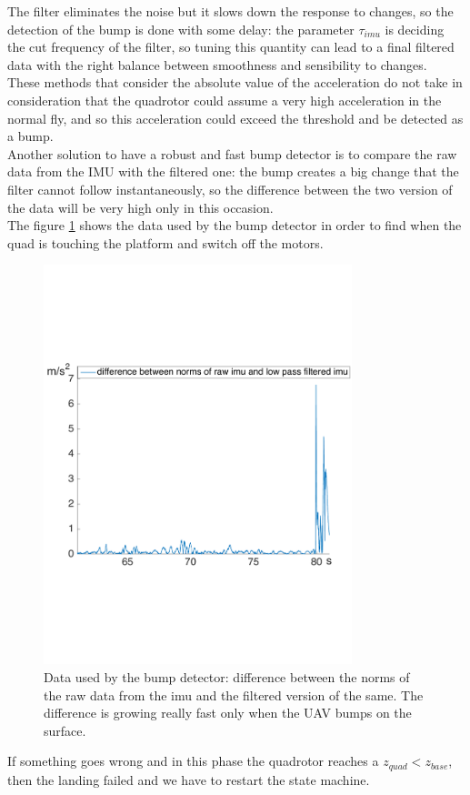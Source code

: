 The filter eliminates the noise but it slows down the response to changes, so the detection of the bump is done with some delay: the parameter $\tau_{imu}$ is deciding the cut frequency of the filter, so tuning this quantity can lead to a final filtered data with the right balance between smoothness and sensibility to changes.\\  

These methods that consider the absolute value of the acceleration do not take in consideration that the quadrotor could assume a very high acceleration in the normal fly, and so this acceleration 
could exceed the threshold and be detected as a bump.\\

Another solution to have a robust and fast bump detector is to compare the raw data from the IMU with the filtered one: the bump creates a big change that the filter cannot follow instantaneously, so the difference between the two version of the data will be very high only in this occasion.\\
The figure \ref{fig:imu_landing} shows the data used by the bump detector in order to find when the quad is touching the platform and switch off the motors.

\begin{figure}[!htbp]
    \centering
    \includegraphics[width=0.8\textwidth]{img/imu_landing.pdf}
    \caption{Data used by the bump detector: difference between the norms of the raw data from the imu and the filtered version of the same. The difference is growing really fast only when the UAV bumps on the surface.}
    \label{fig:imu_landing}
\end{figure}
 
If something goes wrong and in this phase the quadrotor reaches a $z_{quad} < z_{base}$, then the landing failed and we have to restart the state machine.

